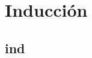 \section{Inducción}




\begin{frame}{}
\end{frame}

\subsection{ind}
\begin{frame}
\subsectionpage
\end{frame}


\begin{frame}{}
\end{frame}


